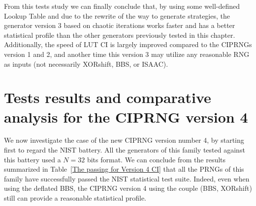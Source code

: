 From this tests study we can finally conclude that,
by using some well-defined Lookup Table and due to the rewrite of the way to generate strategies, 
the generator version 3 based on chaotic iterations works faster and has a better statistical profile than the
other generators previously tested in this chapter. Additionally, the speed of LUT CI is largely improved compared to 
the CIPRNGs version 1 and 2, and another time this version 3 may utilize any 
reasonable RNG as inputs (not necessarily XORshift, BBS, or ISAAC).



\section{Tests results and comparative analysis for the CIPRNG version 4}
\label{test for Version 4 CI}
\label{Results of NIST for Version 4 CI}

We now investigate the case of the new
CIPRNG version number 4, by starting first
to regard the NIST battery.
All the generators of this family tested
against this battery used a
$N = 32$ bits format. 
We can conclude from the results
summarized in Table~\ref{The passing for Version 4 CI} 
that all the PRNGs of this family have successfully passed the NIST statistical test suite. 
Indeed, even when using the deflated BBS, 
the CIPRNG version 4 using the couple (BBS, XORshift) still can provide a reasonable
statistical profile.

